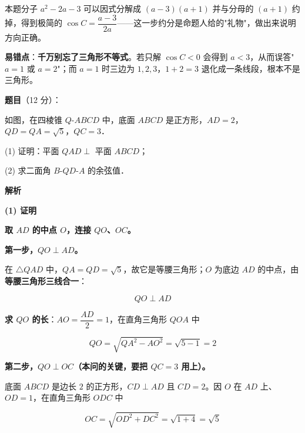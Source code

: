 \begin{answer}
\begin{gktip}
本题分子 $a^{2}-2a-3$ 可以因式分解成 $(a-3)(a+1)$ 并与分母的 $(a+1)$ 约掉，得到极简的 $\cos C=\dfrac{a-3}{2a}$——这一步约分是命题人给的"礼物"，做出来说明方向正确。

\textbf{易错点}：\textbf{千万别忘了三角形不等式}。若只解 $\cos C<0$ 会得到 $a<3$，从而误答"$a=1$ 或 $a=2$"；而 $a=1$ 时三边为 $1,2,3$，$1+2=3$ 退化成一条线段，根本不是三角形。
\end{gktip}



\par\medskip

\end{answer}
\begin{answer}

\textbf{题目}（12 分）：

如图，在四棱锥 $Q\text{-}ABCD$ 中，底面 $ABCD$ 是正方形，$AD=2$，$QD=QA=\sqrt5$，$QC=3$．
\nopagebreak[4]
\begin{center}\end{center}
\nopagebreak[4]
  (1) 证明：平面 $QAD\perp$ 平面 $ABCD$；

  (2) 求二面角 $B\text{-}QD\text{-}A$ 的余弦值．

\textbf{解析}

\par\medskip

\textbf{(1) 证明}

\textbf{取 $AD$ 的中点 $O$，连接 $QO$、$OC$。}

\textbf{第一步，$QO\perp AD$。}

在 $\triangle QAD$ 中，$QA=QD=\sqrt5$，故它是等腰三角形；$O$ 为底边 $AD$ 的中点，由\textbf{等腰三角形三线合一}：

\nopagebreak[4]
\[QO\perp AD\]

\textbf{求 $QO$ 的长}：$AO=\dfrac{AD}2=1$，在直角三角形 $QOA$ 中

\nopagebreak[4]
\[QO=\sqrt{QA^{2}-AO^{2}}=\sqrt{5-1}=2\]

\textbf{第二步，$QO\perp OC$（本问的关键，要把 $QC=3$ 用上）。}

底面 $ABCD$ 是边长 $2$ 的正方形，$CD\perp AD$ 且 $CD=2$。因 $O$ 在 $AD$ 上、$OD=1$，在直角三角形 $ODC$ 中

\nopagebreak[4]
\[OC=\sqrt{OD^{2}+DC^{2}}=\sqrt{1+4}=\sqrt5\]


\end{answer}
